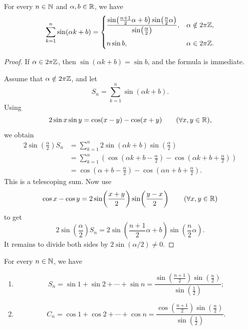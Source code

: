 \begin{claim}\label{claim:3.5}
For every $n\in\mathbb{N}$ and $\alpha,b\in\mathbb{R}$, we have
\[
\sum_{k=1}^{n}\sin(\alpha k+b)
=
\begin{cases}
\displaystyle
\frac{\sin\!\left(\frac{n+1}{2}\alpha+b\right)
      \sin\!\left(\frac n2\alpha\right)}
     {\sin\!\left(\frac\alpha2\right)},
& \alpha\notin2\pi\mathbb{Z},\\[1.2em]
\displaystyle n\sin b,
& \alpha\in2\pi\mathbb{Z}.
\end{cases}
\]
\end{claim}

\begin{proof}
If $\alpha\in2\pi\mathbb{Z}$, then $\sin(\alpha k+b)=\sin b$, and the formula is immediate.

Assume that $\alpha\notin2\pi\mathbb{Z}$, and let
\[
S_n=\sum_{k=1}^{n}\sin(\alpha k+b).
\]
Using
\[
2\sin x\sin y=\cos(x-y)-\cos(x+y)
\qquad(\forall x,y\in\mathbb{R}),
\]
we obtain
\begin{align*}
2\sin\!\left(\frac\alpha2\right)S_n
&=\sum_{k=1}^{n}2\sin(\alpha k+b)\sin\!\left(\frac\alpha2\right)\\
&=\sum_{k=1}^{n}
\left(
\cos\!\left(\alpha k+b-\frac\alpha2\right)
-\cos\!\left(\alpha k+b+\frac\alpha2\right)
\right)\\
&=\cos\!\left(\alpha+b-\frac\alpha2\right)
-\cos\!\left(\alpha n+b+\frac\alpha2\right).
\end{align*}
This is a telescoping sum. Now use
\[
\cos x-\cos y
=2\sin\!\left(\frac{x+y}{2}\right)
 \sin\!\left(\frac{y-x}{2}\right)
\qquad(\forall x,y\in\mathbb{R})
\]
to get
\[
2\sin\!\left(\frac\alpha2\right)S_n
=2\sin\!\left(\frac{n+1}{2}\alpha+b\right)
 \sin\!\left(\frac n2\alpha\right).
\]
It remains to divide both sides by $2\sin(\alpha/2)\ne0$.
\end{proof}

\begin{claim}\label{claim:3.6}
For every $n\in\mathbb{N}$, we have
\begin{enumerate}[label=\arabic*)]
\item\label{item:claim:3.6:1}
\[
S_n=\sin1+\sin2+\cdots+\sin n
=\frac{\sin\!\left(\frac{n+1}{2}\right)
        \sin\!\left(\frac n2\right)}
       {\sin\!\left(\frac12\right)};
\]
\item\label{item:claim:3.6:2}
\[
C_n=\cos1+\cos2+\cdots+\cos n
=\frac{\cos\!\left(\frac{n+1}{2}\right)
        \sin\!\left(\frac n2\right)}
       {\sin\!\left(\frac12\right)}.
\]
\end{enumerate}
\end{claim}

